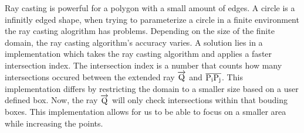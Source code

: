 \documentclass{article}
\begin{document}
Ray casting is powerful for a polygon with a small amount of edges.
A circle is a infinitly edged shape, when trying to parameterize a circle in a finite environment the ray casting alogrithm has problems.
Depending on the size of the finite domain, the ray casting algorithm's accuracy varies.
A solution lies in a implementation\cite{bbox} which takes the ray casting algorithm and applies a faster intersection index.
The intersection index is a number that counts how many intersections occured between the extended ray $\overrightarrow{\rm Q}$ and $\overline{\rm P_iP_j}$.
This implementation differs by restricting the domain to a smaller size based on a user defined box.
Now, the ray $\overrightarrow{\rm Q}$ will only check intersections within that bouding boxes.
This implementation allows for us to be able to focus on a smaller area while increasing the points.


{}

\end{document}
